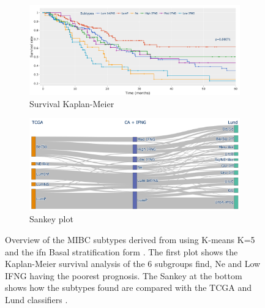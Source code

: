 \begin{figure}[!htb]
    \centering
    \begin{subfigure}[!t]{1.0\textwidth}
        \includegraphics[width=\textwidth,keepaspectratio]{Sections/ClusteringAnalysis/Resources/discussion/survival_K_6.png}    
        \caption{Survival Kaplan-Meier}
        \label{fig:cs:overview_survival}
    \end{subfigure}
    \centering
    \begin{subfigure}[!t]{1.0\textwidth}
        \includegraphics[width=\textwidth,keepaspectratio]{Sections/ClusteringAnalysis/Resources/discussion/KMeans_6_comp.png}
        \caption{Sankey plot}
        \label{fig:cs:overview_comp}
    \end{subfigure} 
    \centering
    \caption[Overview of the MIBC subtypes]{Overview of the MIBC subtypes derived from using K-means K=5 and the \acrshort{ifn} Basal stratification form \citet{Baker2022-bj}. The first plot shows the Kaplan-Meier survival analysis of the 6 subgroups find, Ne and Low IFNG having the poorest prognosis. The Sankey at the bottom shows how the subtypes found are compared with the TCGA and Lund classifiers \citep{Robertson2017-mg,Marzouka2018-ge}.} 
    \label{fig:cs:overview_K_means_6}
\end{figure}




